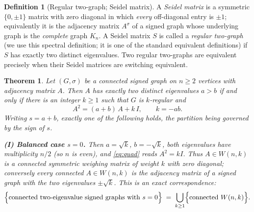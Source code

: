 \documentclass{amsart}
\newtheorem{theorem}{Theorem}
\theoremstyle{definition}
\newtheorem{definition}{Definition}
\begin{document}
\begin{definition}[Regular two-graph; Seidel matrix]\label{def:twograph}
A \emph{Seidel matrix} is a symmetric $\{0,\pm1\}$ matrix with zero diagonal
in which \emph{every} off-diagonal entry is $\pm1$; equivalently it is the
adjacency matrix $A^\sigma$ of a signed graph whose underlying graph is the
\emph{complete} graph $K_n$. A Seidel matrix $S$ is called a \emph{regular
two-graph} (we use this spectral definition; it is one of the standard
equivalent definitions) if $S$ has exactly two distinct eigenvalues. Two
regular two-graphs are equivalent precisely when their Seidel matrices are
switching equivalent.
\end{definition}

\begin{theorem}\label{thm:main}
Let $(G,\sigma)$ be a connected signed graph on $n\ge 2$ vertices with
adjacency matrix $A$. Then $A$ has exactly two distinct eigenvalues $a>b$ if
and only if there is an integer $k\ge1$ such that $G$ is $k$-regular and
\begin{equation}\label{eq:quad}
A^2=(a+b)\,A+k\,I,\qquad k=-ab .
\end{equation}
Writing $s=a+b$, exactly one of the following holds, the partition being
governed by the sign of $s$.

\smallskip
\textbf{(I) Balanced case $s=0$.}
Then $a=\sqrt k$, $b=-\sqrt k$, both eigenvalues have multiplicity $n/2$ (so
$n$ is even), and \eqref{eq:quad} reads $A^2=kI$. Thus $A\in W(n,k)$ is a
connected symmetric weighing matrix of weight $k$ with zero diagonal;
conversely every connected $A\in W(n,k)$ is the adjacency matrix of a signed
graph with the two eigenvalues $\pm\sqrt k$. This is an exact
correspondence:
\[
\Bigl\{\text{connected two-eigenvalue signed graphs with }s=0\Bigr\}
\;=\;\bigcup_{k\ge1}\Bigl\{\text{connected }W(n,k)\Bigr\}.
\]


\end{theorem}
\end{document}
